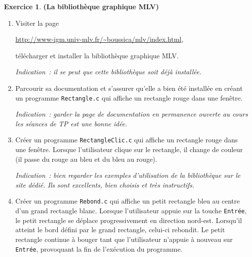 \documentclass[12pt]{article}
\theoremstyle{definition}
\newtheorem{Exercice}{Exercice}
\begin{document}
\begin{Exercice} {\bf (La bibliothèque graphique {\sf MLV})}\smallskip
\begin{enumerate}
   \item Visiter la page
    \begin{center}
        \url{http://www-igm.univ-mlv.fr/~boussica/mlv/index.html},
    \end{center}
    télécharger et installer la bibliothèque graphique {\sf MLV}.
    \smallskip

    {\it Indication~: il se peut que cette bibliothèque soit déjà
    installée.}
    \smallskip

    \item Parcourir sa documentation et s'assurer qu'elle a bien été
    installée en créant un programme {\tt Rectangle.c} qui affiche
    un rectangle rouge dans une fenêtre.
    \smallskip

    {\it Indication~: garder la page de documentation en permanence
    ouverte au cours les séances de TP est une bonne idée.}
    \smallskip

    \item Créer un programme {\tt RectangleClic.c} qui affiche un
    rectangle rouge dans une fenêtre. Lorsque l'utilisateur clique
    sur le rectangle, il change de couleur (il passe du rouge au bleu
    et du bleu au rouge).
    \smallskip

    {\it Indication~: bien regarder les exemples d'utilisation de
    la bibliothèque sur le site dédié. Ils sont excellents, bien choisis
    et très instructifs.}
    \smallskip

    \item Créer un programme {\tt Rebond.c} qui affiche un petit
    rectangle bleu au centre d'un grand rectangle blanc. Lorsque
    l'utilisateur appuie sur la touche {\tt Entrée}, le petit rectangle
    se déplace progressivement en direction nord-est. Lorsqu'il atteint
    le bord défini par le grand rectangle, celui-ci rebondit. Le petit
    rectangle continue à bouger tant que l'utilisateur n'appuie à nouveau
    sur {\tt Entrée}, provoquant la fin de l'exécution du programme.
\end{enumerate}
\end{Exercice}
\bigskip
\end{document}
